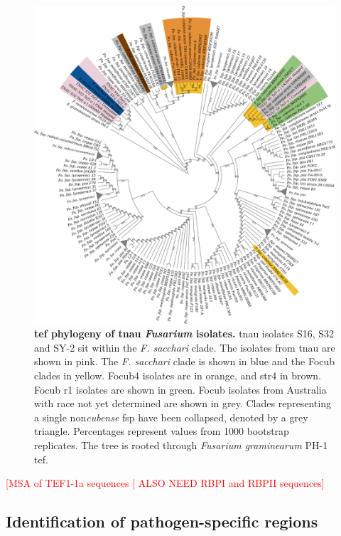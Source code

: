 \bigskip
\begin{figure}[htp!]
    \centering
    \includegraphics[width=14cm]{Figures/TEF1aPhylo-Including_mindanoense.png}
    \caption[\Acl{tef} phylogeny of \acl{tnau} \textit{Fusarium} isolates.]{\textbf{\Acl{tef} phylogeny of \acl{tnau} \textit{Fusarium} isolates.} \Ac{tnau} isolates S16, S32 and SY-2 sit within the\textit{ F. sacchari} clade. The isolates from \ac{tnau} are shown in pink. The \textit{F. sacchari} clade is shown in blue and the \acl{Focub} clades in yellow. \Acl{Focub4} isolates are in orange, and \ac{str4} in brown. \Ac{Focub} \acl{r1} isolates are shown in green. \ac{Focub} isolates from Australia with race not yet determined are shown in grey. Clades representing a single non\-\textit{cubense} \ac{fsp} have been collapsed, denoted by a grey triangle.  Percentages represent values from 1000 bootstrap replicates. The tree is rooted through \textit{Fusarium graminearum} PH-1 \ac{tef}.}
    \label{fig:TEF1aPhylo}
\end{figure}
\bigskip

\textcolor{red}{[MSA of TEF1-1a sequences | ALSO NEED RBPI and RBPII sequences]}

\subsection{Identification of pathogen-specific regions}

